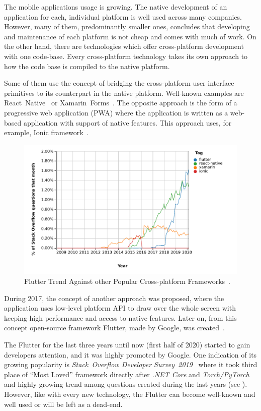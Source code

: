 \begin{introduction}
The mobile applications usage is growing. The native development of an application for each, individual platform is well used across many companies. However, many of them, predominantly smaller ones, concludes that developing and maintenance of each platform is not cheap and comes with much of work. On the other hand, there are technologies which offer cross-platform development with one code-base. Every cross-platform technology takes its own approach to how the code base is compiled to the native platform. 

Some of them use the concept of bridging the cross-platform user interface primitives to its counterpart in the native platform. Well-known examples are React~Native~\cite{react-native} or Xamarin~Forms~\cite{xamarin-forms}. The opposite approach is the form of a progressive web application (PWA) where the application is written as a web-based application with support of native features. This approach uses, for example, Ionic framework~\cite{ionic}. 

\begin{figure}[htp]
    \centering
    \includegraphics[width=0.9\linewidth]{img/introduction/so-flutter-trend.pdf}
    \caption{Flutter Trend Against other Popular Cross-platform Frameworks~\cite{so-flutter-trend}.}
    \label{fig:so-flutter-trend}
\end{figure}

During 2017, the concept of another approach was proposed, where the application uses low-level platform API to draw over the whole screen with keeping high performance and access to native features. Later on, from this concept open-source framework Flutter, made by Google,  was created~\cite{flutter}. 

The Flutter for the last three years until now (first half of 2020) started to gain developers attention, and it was highly promoted by Google. One indication of its growing popularity is \textit{Stack~Overflow Developer Survey~2019}~\cite{so-2019-survey} where it took third place of ``Most Loved'' framework directly after \textit{.NET Core} and \textit{Torch/PyTorch} and highly growing trend among questions created during the last years (see ). However, like with every new technology, the Flutter can become well-known and well used or will be left as a dead-end. 


\end{introduction}
